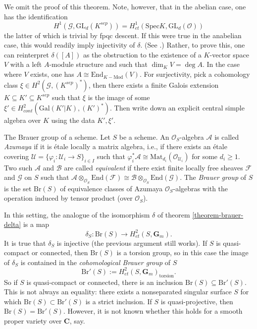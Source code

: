 \noindent
We omit the proof of this theorem. Note, however, that in the abelian case, one
has the identification
$$
H^1 (\mathcal{G}, \text{GL}_d(K^{sep})) = H_{et}^1 (\text{Spec} K,
\text{GL}_d(\mathcal{O}))
$$
the latter of which is trivial by fpqc descent. If this were true in the
anabelian case, this would readily imply injectivity of $\delta$. (See
\cite{SGA4.5}.) Rather, to prove this, one can reinterpret $\delta([A])$ as the
obstruction to the existence of a $K$-vector space $V$ with a left $A$-module
structure and such that $\dim_K V = \deg A$. In the case where $V$ exists, one
has $A \cong \text{End}_{K-\text{Mod}} (V)$. For surjectivity, pick a
cohomology class $\xi \in H^2(\mathcal{G}, (K^{sep})^*)$, then there exists a
finite Galois extension $K \subseteq K' \subseteq K^{sep}$ such that $\xi$ is
the image of some $\xi' \in H_{cont}^2(\text{Gal}(K'|K), (K')^*)$. Then write
down an explicit central simple algebra over $K$ using the data $K', \xi'$.

\medskip\noindent
The Brauer group of a scheme.
Let $S$ be a scheme. An $\mathcal{O}_S$-algebra $\mathcal{A}$ is called
{\it Azumaya} if it is \'etale locally a matrix algebra, i.e., if there
exists an \'etale covering $\mathcal{U} = \{ \varphi_i : \mathcal{U}_i \to S
\}_{i \in I}$ such that $\varphi_i^*\mathcal{A} \cong
\text{Mat}_{d_i}(\mathcal{O}_{\mathcal{U}_i})$ for some $d_i \geq 1$. Two such
$\mathcal{A}$ and $\mathcal{B}$ are called {\it equivalent} if there exist
finite locally free sheaves $\mathcal{F}$ and $\mathcal{G}$ on $S$ such that
$\mathcal{A} \otimes_{\mathcal{O}_S} \text{End}(\mathcal{F}) \cong \mathcal{B}
\otimes_{\mathcal{O}_S} \text{End}(\mathcal{G})$. The {\it Brauer group} of
$S$ is the set $\text{Br}(S)$ of equivalence classes of Azumaya
$\mathcal{O}_S$-algebras with the operation induced by tensor product (over
$\mathcal{O}_S$).

\medskip\noindent
In this setting, the analogue of the isomorphism $\delta$ of theorem
\ref{theorem-brauer-delta} is a map
$$
\delta_S: \text{Br}(S) \to H_{et}^2(S,\mathbf{G}_m).
$$
It is true that $\delta_S$ is injective (the previous argument still works). If
$S$ is quasi-compact or connected, then $\text{Br}(S)$ is a torsion group, so
in this case the image of $\delta_S$ is contained in the {\it cohomological
Brauer group} of $S$
$$
\text{Br}'(S) := H_{et}^2(S,\mathbf{G}_m)_\text{torsion}.
$$
So if $S$ is quasi-compact or connected, there is an inclusion $\text{Br}(S)
\subseteq \text{Br}'(S)$. This is not always an equality: there exists a
nonseparated singular surface $S$ for which $\text{Br}(S) \subset
\text{Br}'(S)$ is a strict inclusion. If $S$ is quasi-projective, then
$\text{Br}(S) = \text{Br}'(S)$. However, it is not known whether this holds for
a smooth proper variety over $\mathbf{C}$, say.


